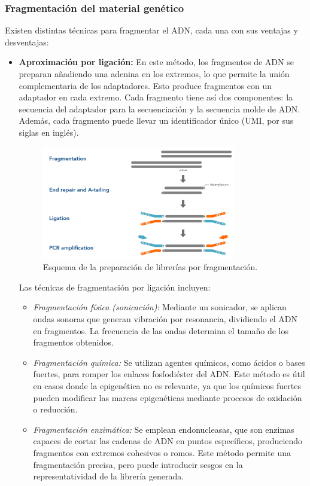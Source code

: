 \subsubsection{Fragmentación del material genético}
Existen distintas técnicas para fragmentar el ADN, cada una con sus ventajas y desventajas:
\begin{itemize}
\item \textbf{Aproximación por ligación:} 
En este método, los fragmentos de ADN se preparan añadiendo una adenina en los extremos, lo que permite la unión complementaria de los adaptadores. Esto produce fragmentos con un adaptador en cada extremo. Cada fragmento tiene así dos componentes: la secuencia del adaptador para la secuenciación y la secuencia molde de ADN. Además, cada fragmento puede llevar un identificador único (UMI, por sus siglas en inglés). 

\begin{figure}[htbp]
\centering
\includegraphics[width = 0.8\textwidth]{figs/19_ng_lib-prep-frag.png}
\caption{Esquema de la preparación de librerías por fragmentación.}
\end{figure}

Las técnicas de fragmentación por ligación incluyen:
\begin{itemize}
\item \textit{Fragmentación física (sonicación)}:
Mediante un sonicador, se aplican ondas sonoras que generan vibración por resonancia, dividiendo el ADN en fragmentos. La frecuencia de las ondas determina el tamaño de los fragmentos obtenidos.
\item \textit{Fragmentación química:}
Se utilizan agentes químicos, como ácidos o bases fuertes, para romper los enlaces fosfodiéster del ADN. Este método es útil en casos donde la epigenética no es relevante, ya que los químicos fuertes pueden modificar las marcas epigenéticas mediante procesos de oxidación o reducción.
\item \textit{Fragmentación enzimática:}
Se emplean endonucleasas, que son enzimas capaces de cortar las cadenas de ADN en puntos específicos, produciendo fragmentos con extremos cohesivos o romos. Este método permite una fragmentación precisa, pero puede introducir sesgos en la representatividad de la librería generada.
\end{itemize}


\end{itemize}
